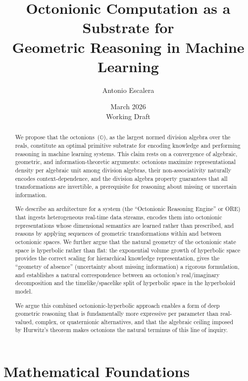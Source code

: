\documentclass[11pt,a4paper]{article}
\title{Octonionic Computation as a Substrate for\\Geometric Reasoning in Machine Learning}
\author{Antonio Escalera}
\date{March 2026\\[0.5em]\normalsize Working Draft}
\newcommand{\Oct}{\mathbb{O}}
\begin{document}
\maketitle

\begin{abstract}
We propose that the octonions~($\Oct$), as the largest normed division algebra over the reals, constitute an optimal primitive substrate for encoding knowledge and performing reasoning in machine learning systems. This claim rests on a convergence of algebraic, geometric, and information-theoretic arguments: octonions maximize representational density per algebraic unit among division algebras, their non-associativity naturally encodes context-dependence, and the division algebra property guarantees that all transformations are invertible, a prerequisite for reasoning about missing or uncertain information.

We describe an architecture for a system (the ``Octonionic Reasoning Engine'' or ORE) that ingests heterogeneous real-time data streams, encodes them into octonionic representations whose dimensional semantics are learned rather than prescribed, and reasons by applying sequences of geometric transformations within and between octonionic spaces. We further argue that the natural geometry of the octonionic state space is hyperbolic rather than flat: the exponential volume growth of hyperbolic space provides the correct scaling for hierarchical knowledge representation, gives the ``geometry of absence'' (uncertainty about missing information) a rigorous formulation, and establishes a natural correspondence between an octonion's real/imaginary decomposition and the timelike/spacelike split of hyperbolic space in the hyperboloid model.

We argue this combined octonionic-hyperbolic approach enables a form of deep geometric reasoning that is fundamentally more expressive per parameter than real-valued, complex, or quaternionic alternatives, and that the algebraic ceiling imposed by Hurwitz's theorem makes octonions the natural terminus of this line of inquiry.
\end{abstract}

\tableofcontents
\newpage

\section{Mathematical Foundations}
\label{sec:foundations}
\end{document}
